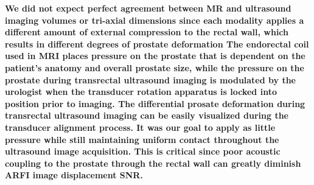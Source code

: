 \textbf{We did not expect perfect agreement between MR and ultrasound imaging
volumes or tri-axial dimensions since each modality applies a different amount
of external compression to the rectal wall, which results in different degrees
of prostate deformation The endorectal coil used in MRI places pressure on the
prostate that is dependent on the patient's anatomy and overall prostate size,
while the pressure on the prostate during transrectal ultrasound imaging is
modulated by the urologist when the transducer rotation apparatus is locked
into position prior to imaging.  The differential prosate deformation during
transrectal ultrasound imaging can be easily visualized during the transducer
alignment process.  It was our goal to apply as little pressure while still
maintaining uniform contact throughout the ultrasound image acquisition. This
is critical since poor acoustic coupling to the prostate through the rectal
wall can greatly diminish ARFI image displacement SNR.}

